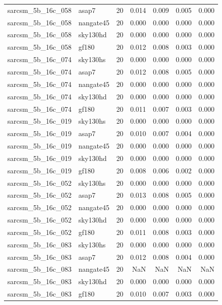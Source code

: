 \begin{tabular}{llrrrrr}
sarcsm\_5b\_16c\_058 & asap7 & 20 & 0.014 & 0.009 & 0.005 & 0.000 \\
sarcsm\_5b\_16c\_058 & nangate45 & 20 & 0.000 & 0.000 & 0.000 & 0.000 \\
sarcsm\_5b\_16c\_058 & sky130hd & 20 & 0.000 & 0.000 & 0.000 & 0.000 \\
sarcsm\_5b\_16c\_058 & gf180 & 20 & 0.012 & 0.008 & 0.003 & 0.000 \\
sarcsm\_5b\_16c\_074 & sky130hs & 20 & 0.000 & 0.000 & 0.000 & 0.000 \\
sarcsm\_5b\_16c\_074 & asap7 & 20 & 0.012 & 0.008 & 0.005 & 0.000 \\
sarcsm\_5b\_16c\_074 & nangate45 & 20 & 0.000 & 0.000 & 0.000 & 0.000 \\
sarcsm\_5b\_16c\_074 & sky130hd & 20 & 0.000 & 0.000 & 0.000 & 0.000 \\
sarcsm\_5b\_16c\_074 & gf180 & 20 & 0.011 & 0.007 & 0.003 & 0.000 \\
sarcsm\_5b\_16c\_019 & sky130hs & 20 & 0.000 & 0.000 & 0.000 & 0.000 \\
sarcsm\_5b\_16c\_019 & asap7 & 20 & 0.010 & 0.007 & 0.004 & 0.000 \\
sarcsm\_5b\_16c\_019 & nangate45 & 20 & 0.000 & 0.000 & 0.000 & 0.000 \\
sarcsm\_5b\_16c\_019 & sky130hd & 20 & 0.000 & 0.000 & 0.000 & 0.000 \\
sarcsm\_5b\_16c\_019 & gf180 & 20 & 0.008 & 0.006 & 0.002 & 0.000 \\
sarcsm\_5b\_16c\_052 & sky130hs & 20 & 0.000 & 0.000 & 0.000 & 0.000 \\
sarcsm\_5b\_16c\_052 & asap7 & 20 & 0.013 & 0.008 & 0.005 & 0.000 \\
sarcsm\_5b\_16c\_052 & nangate45 & 20 & 0.000 & 0.000 & 0.000 & 0.000 \\
sarcsm\_5b\_16c\_052 & sky130hd & 20 & 0.000 & 0.000 & 0.000 & 0.000 \\
sarcsm\_5b\_16c\_052 & gf180 & 20 & 0.011 & 0.008 & 0.003 & 0.000 \\
sarcsm\_5b\_16c\_083 & sky130hs & 20 & 0.000 & 0.000 & 0.000 & 0.000 \\
sarcsm\_5b\_16c\_083 & asap7 & 20 & 0.012 & 0.008 & 0.004 & 0.000 \\
sarcsm\_5b\_16c\_083 & nangate45 & 20 & NaN & NaN & NaN & NaN \\
sarcsm\_5b\_16c\_083 & sky130hd & 20 & 0.000 & 0.000 & 0.000 & 0.000 \\
sarcsm\_5b\_16c\_083 & gf180 & 20 & 0.010 & 0.007 & 0.003 & 0.000 \\

\end{tabular}
